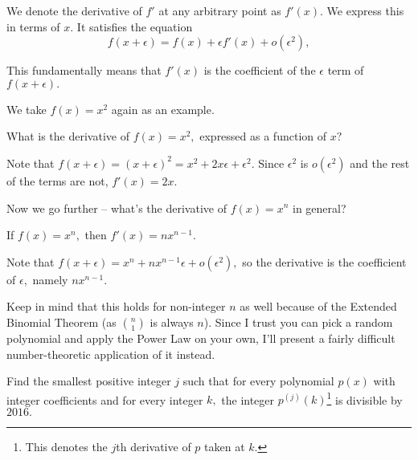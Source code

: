 \documentclass{article}
\begin{document}
\begin{defi}
We denote the derivative of $f'$ at any arbitrary point as $f'(x).$ We express this in terms of $x.$ It satisfies the equation
\[f(x+\epsilon)=f(x)+\epsilon f'(x)+o(\epsilon^2),\]
\end{defi}

This fundamentally means that $f'(x)$ is the coefficient of the $\epsilon$ term of $f(x+\epsilon).$

We take $f(x)=x^2$ again as an example.

\begin{exam}
What is the derivative of $f(x)=x^2,$ expressed as a function of $x?$
\end{exam}

\begin{sol}
Note that $f(x+\epsilon)=(x+\epsilon)^2=x^2+2x\epsilon+\epsilon^2.$ Since $\epsilon^2$ is $o(\epsilon^2)$ and the rest of the terms are not, $f'(x)=2x.$
\end{sol}

Now we go further -- what's the derivative of $f(x)=x^n$ in general?

\begin{theo}
If $f(x)=x^n,$ then $f'(x)=nx^{n-1}.$
\end{theo}

\begin{pro}
Note that $f(x+\epsilon)=x^n+nx^{n-1}\epsilon+o(\epsilon^2),$ so the derivative is the coefficient of $\epsilon,$ namely $nx^{n-1}.$
\end{pro}

Keep in mind that this holds for non-integer $n$ as well because of the Extended Binomial Theorem (as $\binom{n}{1}$ is always $n$). Since I trust you can pick a random polynomial and apply the Power Law on your own, I'll present a fairly difficult number-theoretic application of it instead.

\begin{exam}[Putnam 2016/A1]
Find the smallest positive integer $j$ such that for every polynomial $p(x)$ with integer coefficients and for every integer $k,$ the integer $p^{(j)}(k)$\footnote{This denotes the $j$th derivative of $p$ taken at $k.$} is divisible by $2016.$
\end{exam}
\end{document}
